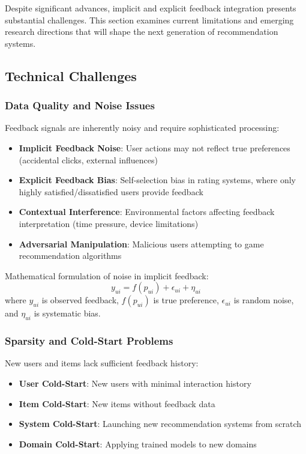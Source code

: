 \documentclass[acmsmall,review,anonymous]{acmart}
\begin{document}
Despite significant advances, implicit and explicit feedback integration presents substantial challenges. This section examines current limitations and emerging research directions that will shape the next generation of recommendation systems.

\subsection{Technical Challenges}

\subsubsection{Data Quality and Noise Issues}

Feedback signals are inherently noisy and require sophisticated processing:

\begin{itemize}
    \item \textbf{Implicit Feedback Noise}: User actions may not reflect true preferences (accidental clicks, external influences)
    \item \textbf{Explicit Feedback Bias}: Self-selection bias in rating systems, where only highly satisfied/dissatisfied users provide feedback
    \item \textbf{Contextual Interference}: Environmental factors affecting feedback interpretation (time pressure, device limitations)
    \item \textbf{Adversarial Manipulation}: Malicious users attempting to game recommendation algorithms
\end{itemize}

Mathematical formulation of noise in implicit feedback:
\begin{equation}
y_{ui} = f(p_{ui}) + \epsilon_{ui} + \eta_{ui}
\end{equation}
where $y_{ui}$ is observed feedback, $f(p_{ui})$ is true preference, $\epsilon_{ui}$ is random noise, and $\eta_{ui}$ is systematic bias.

\subsubsection{Sparsity and Cold-Start Problems}

New users and items lack sufficient feedback history:

\begin{itemize}
    \item \textbf{User Cold-Start}: New users with minimal interaction history
    \item \textbf{Item Cold-Start}: New items without feedback data
    \item \textbf{System Cold-Start}: Launching new recommendation systems from scratch
    \item \textbf{Domain Cold-Start}: Applying trained models to new domains
\end{itemize}
\end{document}
